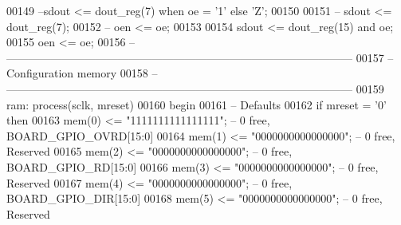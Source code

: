 \begin{DoxyCode}
00149 \textcolor{keyword}{    --sdout <= dout\_reg(7) when oe = '1' else 'Z';}
00150 
00151 \textcolor{keyword}{--  sdout <= dout\_reg(7);}
00152 \textcolor{keyword}{--  oen <= oe;}
00153 
00154     \textcolor{vhdlchar}{sdout} \textcolor{vhdlchar}{<=} \textcolor{vhdlchar}{dout_reg}\textcolor{vhdlchar}{(}\textcolor{vhdllogic}{}\textcolor{vhdllogic}{15}\textcolor{vhdlchar}{)} \textcolor{keywordflow}{and} \textcolor{vhdlchar}{oe};
00155     \textcolor{vhdlchar}{oen} \textcolor{vhdlchar}{<=} \textcolor{vhdlchar}{oe};
00156 \textcolor{keyword}{    -- ---------------------------------------------------------------------------------------------}
00157 \textcolor{keyword}{    -- Configuration memory}
00158 \textcolor{keyword}{    -- --------------------------------------------------------------------------------------------- }
00159     ram: \textcolor{keywordflow}{process}(sclk, mreset)
00160 \textcolor{vhdlkeyword}{    begin}
00161 \textcolor{keyword}{        -- Defaults}
00162         \textcolor{keywordflow}{if} \textcolor{vhdlchar}{mreset} \textcolor{vhdlchar}{=} \textcolor{vhdlchar}{'}\textcolor{vhdllogic}{}\textcolor{vhdllogic}{0}\textcolor{vhdlchar}{'} \textcolor{keywordflow}{then}    
00163             \textcolor{vhdlchar}{mem}\textcolor{vhdlchar}{(}\textcolor{vhdllogic}{}\textcolor{vhdllogic}{0}\textcolor{vhdlchar}{)}  \textcolor{vhdlchar}{<=} \textcolor{vhdllogic}{"1111111111111111"};\textcolor{keyword}{ --  0 free, BOARD\_GPIO\_OVRD[15:0]}
00164             \textcolor{vhdlchar}{mem}\textcolor{vhdlchar}{(}\textcolor{vhdllogic}{}\textcolor{vhdllogic}{1}\textcolor{vhdlchar}{)}  \textcolor{vhdlchar}{<=} \textcolor{vhdllogic}{"0000000000000000"};\textcolor{keyword}{ --  0 free, Reserved}
00165             \textcolor{vhdlchar}{mem}\textcolor{vhdlchar}{(}\textcolor{vhdllogic}{}\textcolor{vhdllogic}{2}\textcolor{vhdlchar}{)}  \textcolor{vhdlchar}{<=} \textcolor{vhdllogic}{"0000000000000000"};\textcolor{keyword}{ --  0 free, BOARD\_GPIO\_RD[15:0]}
00166             \textcolor{vhdlchar}{mem}\textcolor{vhdlchar}{(}\textcolor{vhdllogic}{}\textcolor{vhdllogic}{3}\textcolor{vhdlchar}{)}  \textcolor{vhdlchar}{<=} \textcolor{vhdllogic}{"0000000000000000"};\textcolor{keyword}{ --  0 free, Reserved}
00167             \textcolor{vhdlchar}{mem}\textcolor{vhdlchar}{(}\textcolor{vhdllogic}{}\textcolor{vhdllogic}{4}\textcolor{vhdlchar}{)}  \textcolor{vhdlchar}{<=} \textcolor{vhdllogic}{"0000000000000000"};\textcolor{keyword}{ --  0 free, BOARD\_GPIO\_DIR[15:0]}
00168             \textcolor{vhdlchar}{mem}\textcolor{vhdlchar}{(}\textcolor{vhdllogic}{}\textcolor{vhdllogic}{5}\textcolor{vhdlchar}{)}  \textcolor{vhdlchar}{<=} \textcolor{vhdllogic}{"0000000000000000"};\textcolor{keyword}{ --  0 free, Reserved}

\end{DoxyCode}
